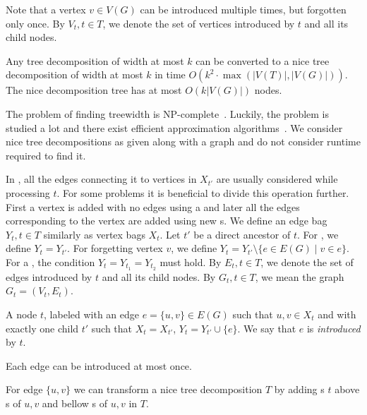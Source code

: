 Note that a vertex \( v \in V(G) \) can be introduced multiple times,
but forgotten only once.
By \( V_t, t \in T \), we denote the set of vertices introduced by \( t \)
and all its child nodes.

\begin{lemma}
	Any tree decomposition of width at most \( k \) can be converted to
	a nice tree decomposition of width at most \( k \)
	in time \( O(k^2 \cdot \max(|V(T)|, |V(G)|)) \).
	The nice decomposition tree has at most \( O(k|V(G)|) \) nodes.
\end{lemma}

The problem of finding treewidth is NP-complete~\cite{tree_width_np_complete}.
Luckily, the problem is studied a lot and
there exist efficient approximation algorithms~\cite{tree_width_approximation}.
We consider nice tree decompositions as given along with a graph
and do not consider runtime required to find it.

In \IntroduceVertexNode{}, all the edges connecting it
to vertices in \( X_{t'} \) are usually considered while processing \( t \).
%
For some problems it is beneficial to divide this operation further.
First a vertex is added with no edges using a \IntroduceVertexNode{}
and later all the edges corresponding to the vertex are added using new \IntroduceEdgeNode{}s.
We define an edge bag \( Y_t, t \in T \) similarly as vertex bags \( X_t \).
%
Let \( t' \) be a direct ancestor of \( t \).
For \IntroduceVertexNode{}, we define \( Y_t = Y_{t'} \).
For \ForgetVertexNode{} forgetting vertex \( v \),
we define \( Y_t = Y_{t'} \setminus \{ e \in E(G) \mid v \in e\} \).
For a \JoinNode{}, the condition \( Y_t = Y_{t_1} = Y_{t_2} \) must hold.
%
By \( E_t, t \in T \), we denote the set of edges introduced by \( t \)
and all its child nodes.
By \( G_t, t \in T \), we mean the graph \( G_t = (V_t, E_t) \).
%
\begin{definition}
	A node \( t \), labeled with an edge \( e = \{u, v\} \in E(G) \)
	such that \( u, v \in X_t \) and with exactly one child \( t' \)
	such that \( X_t = X_{t'} \), \( Y_t = Y_{t'} \cup \{e\} \).
	We say that \( e \) is \emph{introduced} by \( t \).
\end{definition}
%
Each edge can be introduced at most once.

For edge \( \{u, v\} \) we can transform a nice tree decomposition \( T \)
by adding \IntroduceEdgeNode{}s \( t \) above \IntroduceVertexNode{}s of \( u, v \)
and bellow \ForgetVertexNode{}s of \( u, v \) in \( T \).

